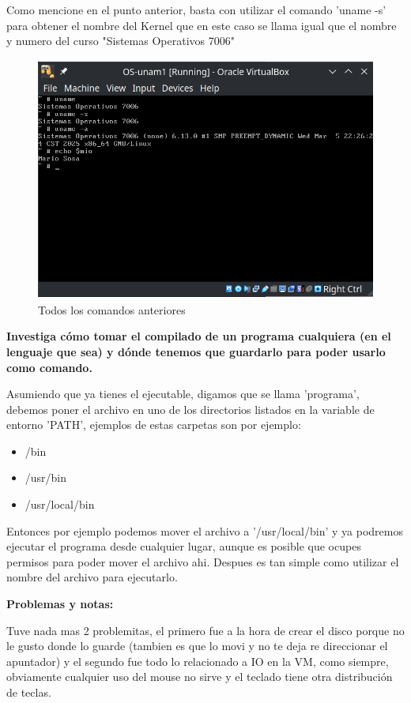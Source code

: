 Como mencione en el punto anterior, basta con utilizar el comando 'uname -s' para obtener el nombre del Kernel que en este caso se llama igual que el nombre y numero del curso "Sistemas Operativos 7006" \vspace{.2cm}

\begin{figure}[H]
    \centering
    \includegraphics[height=8cm]{src/Img/2.png}
    \caption{Todos los comandos anteriores}
    \label{fig:allcmd}
\end{figure}

\item \textbf{Investiga cómo tomar el compilado de un programa cualquiera (en el lenguaje que sea) y dónde tenemos que guardarlo para poder usarlo como comando.}  \vspace{0.3cm}

Asumiendo que ya tienes el ejecutable, digamos que se llama 'programa', debemos poner el archivo en uno de los directorios listados en la variable de entorno 'PATH', ejemplos de estas carpetas son por ejemplo:\vspace{.2cm}

\begin{itemize}
    \item /bin
    \item /usr/bin
    \item /usr/local/bin
\end{itemize} \vspace{.2cm}

Entonces por ejemplo podemos mover el archivo a '/usr/local/bin' y ya podremos ejecutar el programa desde cualquier lugar, aunque es posible que ocupes permisos para poder mover el archivo ahi. Despues es tan simple como utilizar el nombre del archivo para ejecutarlo. \cite{compilado2023} \vspace{.2cm} 


\textbf{Problemas y notas:}  \vspace{0.3cm}

Tuve nada mas 2 problemitas, el primero fue a la hora de crear el disco porque no le gusto donde lo guarde (tambien es que lo movi y no te deja re direccionar el apuntador) y el segundo fue todo lo relacionado a IO en la VM, como siempre, obviamente cualquier uso del mouse no sirve y el teclado tiene otra distribución de teclas. \vspace{.2cm}

